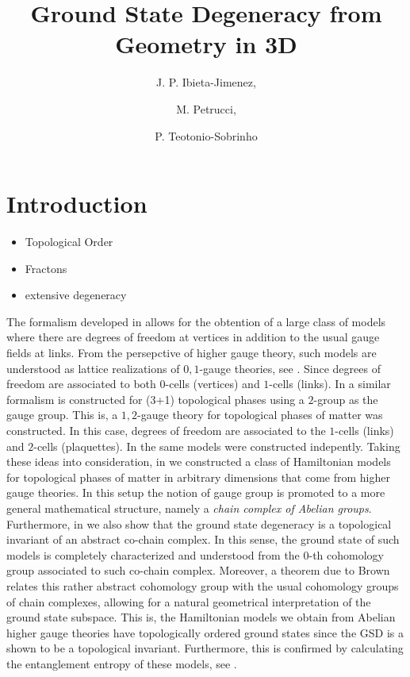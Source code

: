 \documentclass[a4paper,11pt]{article}
\title{\textbf{Ground State Degeneracy from Geometry in 3D}}
\author[a,1]{J. P. Ibieta-Jimenez,\note{Corresponding author.}}
\author[a]{M. Petrucci,}
\author[a]{P. Teotonio-Sobrinho}
\affiliation[a]{Departamento de F\'isica Matem\'atica, Universidade de S\~ao Paulo\\ Rua do Mat\~ao Travessa R 187, CEP 05508-090, S\~ao Paulo, Brazil.}
\theoremstyle{plain}%
\theoremstyle{definition}
\theoremstyle{remark}
\begin{document}
 
\maketitle
\flushbottom

\section{Introduction}
\label{sec:intro}
\begin{itemize}
\item Topological Order
\item Fractons
\item extensive degeneracy
\end{itemize}
The formalism developed in \cite{Matter} allows for the obtention of a large class of models where there are degrees of freedom at vertices in addition to the usual gauge fields at links. From the persepctive of higher gauge theory, such models are understood as lattice realizations of $0,1$-gauge theories, see \cite{higher, higher-ent}. Since degrees of freedom are associated to both $0$-cells (vertices) and $1$-cells (links). In \cite{kazuophd,ricardomsc} a similar formalism is constructed for (3+1) topological phases using a $2$-group as the gauge group. This is, a $1,2$-gauge theory for topological phases of matter was constructed. In this case, degrees of freedom are associated to the $1$-cells (links) and $2$-cells (plaquettes). In \cite{Bullivant16, Bullivant17} the same models were constructed indepently. Taking these ideas into consideration, in \cite{higher} we constructed a class of Hamiltonian models for topological phases of matter in arbitrary dimensions that come from higher gauge theories. In this setup the notion of gauge group is promoted to a more general mathematical structure, namely a \textit{chain complex of Abelian groups}. Furthermore, in \cite{higher} we also show that the ground state degeneracy is a topological invariant of an abstract co-chain complex. In this sense, the ground state of such models is completely characterized and understood from the $0$-th cohomology group associated to such co-chain complex. Moreover, a theorem due to Brown \cite{Brown} relates this rather abstract cohomology group with the usual cohomology groups of chain complexes, allowing for a natural geometrical interpretation of the ground state subspace. This is, the Hamiltonian models we obtain from Abelian higher gauge theories have topologically ordered ground states since the GSD is a shown to be a topological invariant. Furthermore, this is confirmed by calculating the entanglement entropy of these models, see \cite{higher-ent}.
\end{document}
